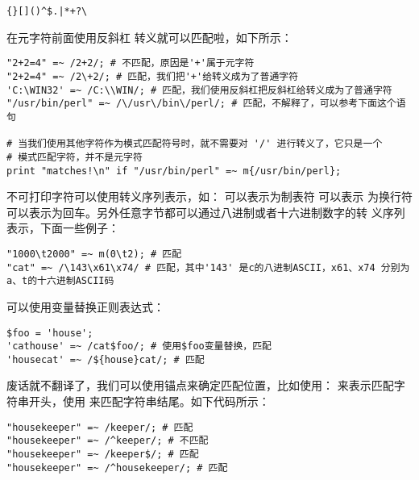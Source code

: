 \documentclass{article}
\begin{document}
\begin{verbatim}
{}[]()^$.|*+?\
\end{verbatim}

在元字符前面使用反斜杠 \code{{\color{blue}\\}} 转义就可以匹配啦，如下所示：

\begin{verbatim}
"2+2=4" =~ /2+2/; # 不匹配，原因是'+'属于元字符
"2+2=4" =~ /2\+2/; # 匹配，我们把'+'给转义成为了普通字符
'C:\WIN32' =~ /C:\\WIN/; # 匹配，我们使用反斜杠把反斜杠给转义成为了普通字符
"/usr/bin/perl" =~ /\/usr\/bin\/perl/; # 匹配，不解释了，可以参考下面这个语句

# 当我们使用其他字符作为模式匹配符号时，就不需要对 '/' 进行转义了，它只是一个
# 模式匹配字符，并不是元字符
print "matches!\n" if "/usr/bin/perl" =~ m{/usr/bin/perl}; 
\end{verbatim}

不可打印字符可以使用转义序列表示，如：\code{{\color{blue}\\t}} 可以表示为制表符 \code{{\color{blue}\\n}} 可以表示
为换行符\code{{\color{blue}\\r}} 可以表示为回车。另外任意字节都可以通过{\color{red}八进制或者十六进制}数字的转
义序列表示，下面一些例子：

\begin{verbatim}
"1000\t2000" =~ m(0\t2); # 匹配
"cat" =~ /\143\x61\x74/ # 匹配，其中'143' 是c的八进制ASCII，x61、x74 分别为a、t的十六进制ASCII码
\end{verbatim}

可以使用变量替换正则表达式：

\begin{verbatim}
$foo = 'house';
'cathouse' =~ /cat$foo/; # 使用$foo变量替换，匹配
'housecat' =~ /${house}cat/; # 匹配
\end{verbatim}

废话就不翻译了，我们可以使用锚点来确定匹配位置，比如使用：\code{\^} 来表示匹配字符串开头，使用
\code{{\color{blue}\$}} 来匹配字符串结尾。如下代码所示：

\begin{verbatim}
"housekeeper" =~ /keeper/; # 匹配
"housekeeper" =~ /^keeper/; # 不匹配
"housekeeper" =~ /keeper$/; # 匹配
"housekeeper" =~ /^housekeeper/; # 匹配
\end{verbatim}
\end{document}
